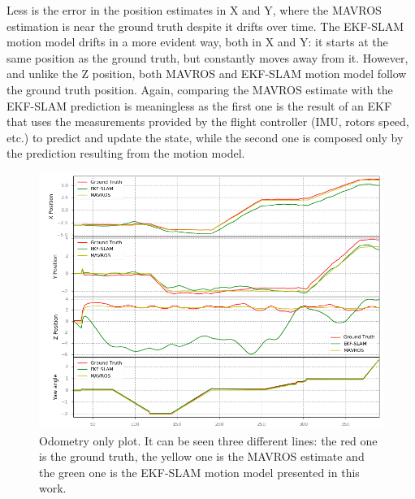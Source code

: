 Less is the error in the position estimates in X and Y, where the MAVROS estimation is near the ground truth despite it drifts over time. The EKF-SLAM motion model drifts in a more evident way, both in X and Y: it starts at the same position as the ground truth, but constantly moves away from it. However, and unlike the Z position, both MAVROS and EKF-SLAM motion model follow the ground truth position. Again, comparing the MAVROS estimate with the EKF-SLAM prediction is meaningless as the first one is the result of an \ac{EKF} that uses the measurements provided by the flight controller (IMU, rotors speed, etc.) to predict and update the state, while the second one is composed only by the prediction resulting from the motion model.
\begin{figure}
    \centering
    \includegraphics[width=\textwidth]{Images/fig19-odom_only}
    \caption[Odometry only plot]{Odometry only plot. It can be seen three different lines: the red one is the ground truth, the yellow one is the MAVROS estimate and the green one is the EKF-SLAM motion model presented in this work.}
    \label{fig:chapter3:odom-only}
\end{figure}


